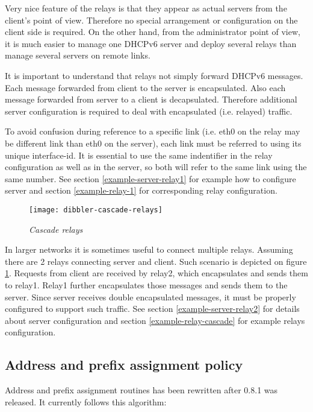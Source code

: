 Very nice feature of the relays is that they appear as actual servers
from the client's point of view. Therefore no special arrangement or
configuration on the client side is required. On the other hand, from
the administrator point of view, it is much easier to manage one DHCPv6
server and deploy several relays than manage several servers on remote
links.

It is important to understand that relays not simply forward DHCPv6
messages. Each message forwarded from client to the server is
encapsulated. Also each message forwarded from server to a client is
decapsulated. Therefore additional server configuration is required to
deal with encapsulated (i.e. relayed) traffic.

To avoid confusion during reference to a specific link (i.e. eth0 on
the relay may be different link than eth0 on the server), each link
must be referred to using its unique interface-id. It is essential to 
use the same indentifier in the relay
configuration as well as in the server, so both will refer to the same
link using the same number. See section \ref{example-server-relay1} for
example how to configure server and section \ref{example-relay-1} for
corresponding relay configuration.

\begin{figure}[ht]
\begin{center}
\texttt{[image: dibbler-cascade-relays]}
\caption{\emph{Cascade relays}}
\label{fig-cascade-relays}
\end{center}
\end{figure}

In larger networks it is sometimes useful to connect multiple
relays. Assuming there are 2 relays connecting server and client. Such
scenario is depicted on figure \ref{fig-cascade-relays}. Requests from
client are received by relay2, which encapsulates and sends them to
relay1. Relay1 further encapsulates those messages and sends them to
the server. Since server receives double encapsulated messages, it
must be properly configured to support such traffic. See section
\ref{example-server-relay2} for details about server configuration and
section \ref{example-relay-cascade} for example relays configuration.

\subsection{Address and prefix assignment policy}

Address and prefix assignment routines has been rewritten after 0.8.1
was released. It currently follows this algorithm:

